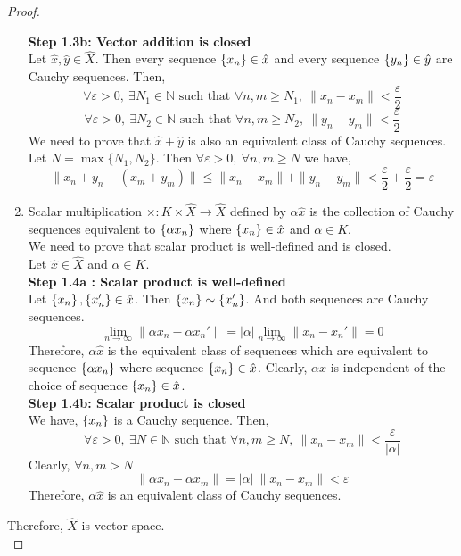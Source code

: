 \begin{proof}
\begin{enumerate}
			\textbf{Step 1.3b: Vector addition is closed}\\
			Let $\hat{x},\hat{y} \in \hat{X}$.
			Then every sequence $\left\{x_n\right\} \in \hat{x}$ and every sequence $\left\{y_n\right\} \in \hat{y}$ are Cauchy sequences.
			Then,
			\[ \forall \varepsilon > 0,\ \exists N_1 \in \mathbb{N} \text{ such that } \forall n,m \ge N_1,\ \| x_n - x_m \| < \frac{\varepsilon}{2} \]
			\[ \forall \varepsilon > 0,\ \exists N_2 \in \mathbb{N} \text{ such that } \forall n,m \ge N_2,\ \| y_n - y_m \| < \frac{\varepsilon}{2} \]
			We need to prove that $\hat{x}+\hat{y}$ is also an equivalent class of Cauchy sequences.
			Let $N = \max\{ N_1,N_2 \}$.
			Then $\forall \varepsilon > 0,\ \forall n,m \ge N$ we have,
			\[ \| x_n+y_n - (x_m+y_m) \| \le \| x_n - x_m \| + \| y_n - y_m \| < \frac{\varepsilon}{2} + \frac{\varepsilon}{2} = \varepsilon \]
		\item Scalar multiplication $\times : K \times \hat{X} \to \hat{X}$ defined by $\alpha \hat{x}$ is the collection of Cauchy sequences equivalent to $\left\{\alpha x_n\right\}$ where $\left\{x_n\right\} \in \hat{x}$ and $\alpha \in K$.\\

			We need to prove that scalar product is well-defined and is closed.\\
			Let $\hat{x} \in \hat{X}$ and $\alpha \in K$.\\

			\textbf{Step 1.4a : Scalar product is well-defined}\\
			Let $\left\{x_n\right\},\left\{x_n'\right\} \in \hat{x}$.
			Then $\left\{x_n\right\} \sim \left\{x_n'\right\}$.
			And both sequences are Cauchy sequences.
			\[ \lim_{n \to \infty} \| \alpha x_n - \alpha x_n' \| = |\alpha| \lim_{n \to \infty} \| x_n - x_n' \| = 0 \]
			Therefore, $\alpha\hat{x}$ is the equivalent class of sequences which are equivalent to sequence $\left\{\alpha x_n\right\}$ where sequence $\left\{x_n\right\} \in \hat{x}$.
			Clearly, $\alpha\hat{x}$ is independent of the choice of sequence $\left\{x_n\right\} \in \hat{x}$.\\

			\textbf{Step 1.4b: Scalar product is closed}\\
			We have, $\left\{x_n\right\}$ is a Cauchy sequence.
			Then, 
			\[ \forall \varepsilon > 0,\ \exists N \in \mathbb{N} \text{ such that } \forall n,m \ge N,\ \| x_n - x_m \| < \frac{\varepsilon}{|\alpha|} \]
			Clearly, $\forall n,m > N$
			\[ \| \alpha x_n - \alpha x_m \| = |\alpha|\ \| x_n - x_m \| < \varepsilon \]
			Therefore, $\alpha\hat{x}$ is an equivalent class of Cauchy sequences.
	\end{enumerate}
	Therefore, $\hat{X}$ is vector space.\\


\end{proof}
